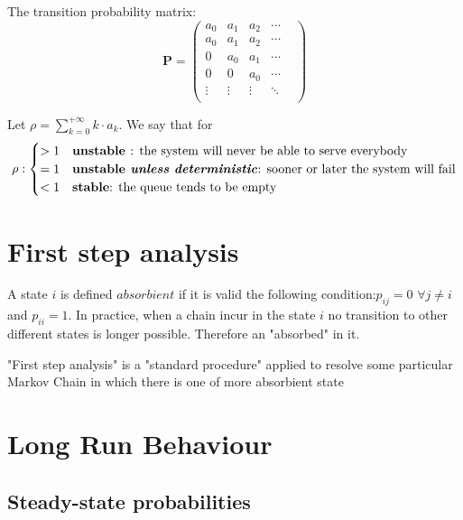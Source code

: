 The transition probability matrix:
\begin{equation} \bm P=\begin{pmatrix}
	a_{0} & a_{1} & a_2 & \cdots  \\
	a_{0} & a_{1} & a_2 & \cdots  \\
	0			& a_{0} & a_{1} & \cdots  \\
	0 		& 0			& a_{0} & \cdots  \\
	\vdots & \vdots & \vdots & \ddots &  \\
\end{pmatrix}
\end{equation}
\begin{definition}[Behavior of a MC]
Let $\rho=\sum\limits_{k=0}^{+\infty} k \cdot a_k$. We say that for
\begin{equation} \rho : \begin{cases}
	>1 & \text{\textbf{unstable }: the system will never be able to serve everybody}\\
	=1 & \text{\textbf{unstable \textit{unless deterministic}}: sooner or later the system will fail}\\
	<1 & \text{\textbf{stable}: the queue tends to be empty}
\end{cases}\end{equation}
\end{definition}

\section{First step analysis}
\begin{definition}
	 A state $i$ is defined $absorbient$ if it is valid the following condition:$p_{ij}=0$ $\forall j\neq i$ and $p_{ii}=1$. In practice, when a chain incur in the state $i$ no transition to other different states is longer possible. Therefore  an "absorbed" in it. 
\end{definition}
"First step analysis" is a "standard procedure" applied to resolve some particular Markov Chain in which there is one of more absorbient state
\section{Long Run Behaviour}

\subsection{Steady-state probabilities}

